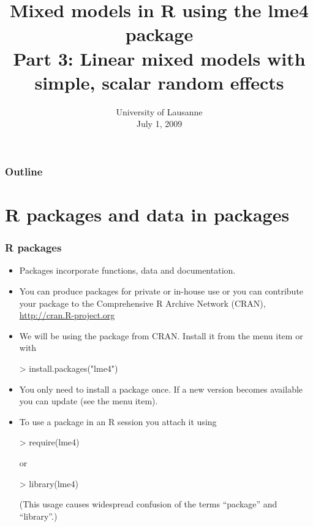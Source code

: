 
\usepackage{SweaveSlides}
\title[lme4]{Mixed models in R using the lme4 package\\Part 3: Linear mixed models with simple, scalar random effects}
\subject{LMM}
\date[July 1, 2009]{University of Lausanne\\July 1, 2009}

\frame{\titlepage}
\begin{frame}
  \frametitle{Outline}
\end{frame}

\newcommand{\bc}[1]{\ensuremath{\bm{\mathcal{#1}}}}



\section[Packages]{R packages and data in packages}

\begin{frame}[fragile]
  \frametitle{R packages}
  \begin{itemize}
  \item Packages incorporate functions, data and documentation.
  \item You can produce packages for private or in-house use or you
    can contribute your package to the Comprehensive R Archive Network
    (CRAN), \url{http://cran.R-project.org}
  \item We will be using the  package from CRAN.
    Install it from the  menu item or with
\begin{Schunk}
\begin{Sinput}
> install.packages("lme4")
\end{Sinput}
\end{Schunk}
\item You only need to install a package once.  If a new version
  becomes available you can update (see the menu item).
\item To use a package in an R session you attach it using
\begin{Schunk}
\begin{Sinput}
> require(lme4)
\end{Sinput}
\end{Schunk}
  or
\begin{Schunk}
\begin{Sinput}
> library(lme4)
\end{Sinput}
\end{Schunk}
  (This usage causes widespread confusion of the terms ``package'' and ``library''.)
  \end{itemize}
\end{frame}


